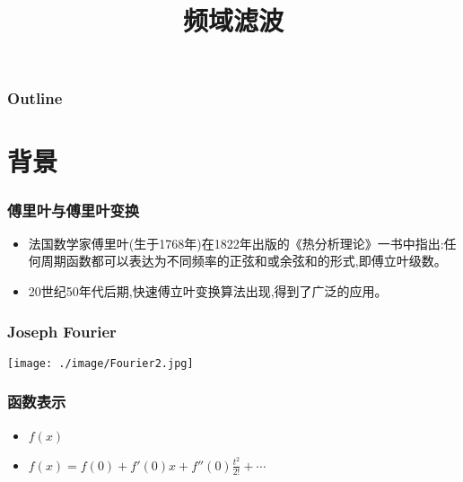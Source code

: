 \documentclass{beamer}
\title{频域滤波}
\author{}
\date{}
\begin{document}
\maketitle

\begin{frame}
\frametitle{Outline}
\setcounter{tocdepth}{3}
\tableofcontents
\end{frame}













\section{背景}
\label{sec-1}
\begin{frame}
\frametitle{傅里叶与傅里叶变换}
\label{sec-1-1}

\begin{itemize}
\item 法国数学家傅里叶(生于1768年)在1822年出版的《热分析理论》一书中指出:任何周期函数都可以表达为不同频率的正弦和或余弦和的形式,即傅立叶级数。
\item 20世纪50年代后期,快速傅立叶变换算法出现,得到了广泛的应用。
\end{itemize}
\end{frame}
\begin{frame}
\frametitle{Joseph Fourier}
\label{sec-1-2}

\begin{center}
\texttt{[image: ./image/Fourier2.jpg]}
\end{center}
\end{frame}
\begin{frame}
\frametitle{函数表示}
\label{sec-1-3}

\begin{itemize}
\item $f(x)$
\item $f(x)=f(0)+f'(0)x+f''(0)\frac{t^2}{2!}+\cdots$
\end{itemize}
\end{frame}
\end{document}
